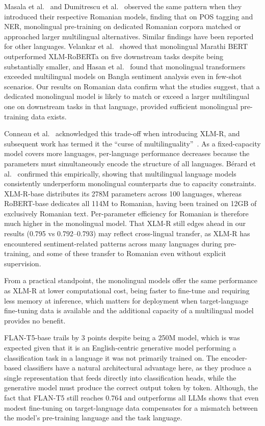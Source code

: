 \documentclass[12pt,a4paper]{report}
\begin{document}
Masala et al.~\cite{masala2020robert} and Dumitrescu et al.~\cite{dumitrescu2020birth} observed the 
same pattern when they introduced their respective Romanian models, finding that on POS tagging and NER, 
monolingual pre-training on dedicated Romanian corpora matched or approached larger multilingual alternatives. 
Similar findings have been reported for other languages. Velankar et al.~\cite{velankar2022mono} showed that 
monolingual Marathi BERT outperformed XLM-RoBERTa on five downstream tasks despite being substantially 
smaller, and Hasan et al.~\cite{tanvir2023bangla} found that monolingual transformers exceeded multilingual 
models on Bangla sentiment analysis even in few-shot scenarios. Our results on Romanian data confirm what
the studies suggest, that a dedicated monolingual model is likely to match or exceed a larger multilingual one on downstream tasks in that 
language, provided sufficient monolingual pre-training data exists.

Conneau et al.~\cite{conneau2020unsupervised} acknowledged this trade-off when introducing XLM-R, and 
subsequent work has termed it the ``curse of multilinguality''~\cite{chang2023multilinguality, 
pfeiffer2024breaking}. As a fixed-capacity model covers more languages, per-language performance decreases 
because the parameters must simultaneously encode the structure of all languages. 
Bérard et al.~\cite{berard2026capacity} confirmed this empirically, showing that multilingual language models 
consistently underperform monolingual counterparts due to capacity constraints. XLM-R-base distributes 
its 278M parameters across 100 languages, whereas RoBERT-base dedicates all 114M to Romanian, having been 
trained on 12GB of exclusively Romanian text. Per-parameter efficiency for Romanian is therefore much higher 
in the monolingual model. That XLM-R still edges ahead in our results (0.795 vs 0.792--0.793) may reflect 
cross-lingual transfer, as XLM-R has encountered sentiment-related patterns across many languages during 
pre-training, and some of these transfer to Romanian even without explicit supervision.

From a practical standpoint, the monolingual models offer the same performance as XLM-R at lower computational 
cost, being faster to fine-tune and requiring less memory at inference, which matters for deployment when 
target-language fine-tuning data is available and the additional capacity of a multilingual model provides 
no benefit.

FLAN-T5-base trails by 3 points despite being a 250M model, which is was expected given that it is an 
English-centric generative model performing a classification task in a language it was not primarily trained 
on. The encoder-based classifiers have a natural architectural advantage here, as they produce a single 
representation that feeds directly into classification heads, while the generative model must produce the 
correct output token by token. Although, the fact that FLAN-T5 
still reaches 0.764 and outperforms all LLMs shows that even modest fine-tuning on target-language data 
compensates for a mismatch between the model's pre-training language and the task language.
\end{document}
